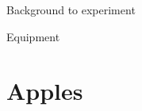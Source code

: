 \documentclass[letterpaper]{labmanual}
\begin{document}
\begin{background}
    Background to experiment
\end{background}

\begin{equipment}
    \item Equipment
\end{equipment}

\pagebreak

\section{Apples}
\end{document}
